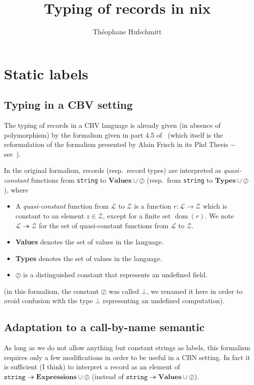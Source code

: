 \documentclass{article}
\title{Typing of records in nix}
\author{Théophane Hufschmitt}
\date{}
\newcommand{\ty}[1]{\texttt{#1}}
\newcommand{\set}[1]{\ensuremath{\mathcal{#1}}}
\newcommand{\undef}{\oslash}
\newcommand{\quasiconst}{\twoheadrightarrow}
\DeclareMathOperator\dom{dom}
\begin{document}
\maketitle{}

\section{Static labels}
\subsection{Typing in a CBV setting}
The typing of records in a CBV language is already given (in absence of
polymorphism) by the formalism given in part 4.5 of~\cite{Cas15} (which itself
is the reformulation of the formalism presented by Alain Frisch in its Phd
Thesis − see~\cite{Fri04}).

In the original formalism, records (resp.\ record types) are interpreted as
\emph{quasi-constant} functions from \ty{string} to $\textbf{Values} \cup
\undef$ (resp.\ from \ty{string} to $\textbf{Types} \cup \undef$), where
\begin{itemize}
  \item A \emph{quasi-constant} function from \set{L} to \set{Z} is a
    function $r: \set{L} \rightarrow \set{Z}$ which is constant to an element
    $z \in \set{Z}$, except for a finite set $\dom(r)$. We note $\set{L}
    \quasiconst \set{Z}$ for the set of quasi-constant functions from \set{L}
    to \set{Z}.
  \item \textbf{Values} denotes the set of values in the language.
  \item \textbf{Types} denotes the set of values in the language.
  \item $\undef$ is a distinguished constant that represents an undefined
    field.
\end{itemize}

(in this formalism, the constant $\undef$ was called $\bot$, we renamed it here
in order to avoid confusion with the type $\bot$ representing an undefined
computation).

\subsection{Adaptation to a call-by-name semantic}

As long as we do not allow anything but constant strings as labels, this
formalism requires only a few modifications in order to be useful in a CBN
setting. In fact it is sufficient (I think) to interpret a record as an element
of $\ty{string} \quasiconst \textbf{Expressions} \cup \undef$ (instead of
$\ty{string} \quasiconst \textbf{Values} \cup \undef$).
\end{document}
